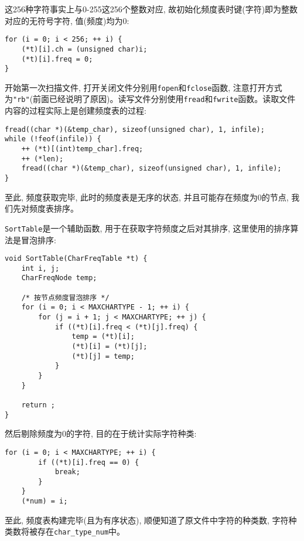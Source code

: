 \documentclass[a4paper]{ctexart}
\begin{document}
这256种字符事实上与0-255这256个整数对应, 故初始化频度表时键(字符)即为整数对应的无符号字符, 值(频度)均为0:

{\setmainfont{Courier New Bold}              
\begin{lstlisting}
for (i = 0; i < 256; ++ i) {
    (*t)[i].ch = (unsigned char)i;
    (*t)[i].freq = 0;
}
\end{lstlisting}}

开始第一次扫描文件, 打开关闭文件分别用\texttt{fopen}和\texttt{fclose}函数, 注意打开方式为\texttt{"rb"}(前面已经说明了原因)。读写文件分别使用\texttt{fread}和\texttt{fwrite}函数。读取文件内容的过程实际上是创建频度表的过程:

{\setmainfont{Courier New Bold}              
\begin{lstlisting}
fread((char *)(&temp_char), sizeof(unsigned char), 1, infile);
while (!feof(infile)) {
    ++ (*t)[(int)temp_char].freq;
    ++ (*len);
    fread((char *)(&temp_char), sizeof(unsigned char), 1, infile);
}
\end{lstlisting}}

至此, 频度获取完毕, 此时的频度表是无序的状态, 并且可能存在频度为0的节点, 我们先对频度表排序。

\texttt{SortTable}是一个辅助函数, 用于在获取字符频度之后对其排序, 这里使用的排序算法是冒泡排序:

{\setmainfont{Courier New Bold}              
\begin{lstlisting}
void SortTable(CharFreqTable *t) {
    int i, j;
    CharFreqNode temp;

    /* 按节点频度冒泡排序 */
    for (i = 0; i < MAXCHARTYPE - 1; ++ i) {
        for (j = i + 1; j < MAXCHARTYPE; ++ j) {
            if ((*t)[i].freq < (*t)[j].freq) {
                temp = (*t)[i];
                (*t)[i] = (*t)[j];
                (*t)[j] = temp;
            }
        }
    }

    return ;
}
\end{lstlisting}}

然后剔除频度为0的字符, 目的在于统计实际字符种类:

{\setmainfont{Courier New Bold}              
\begin{lstlisting}
for (i = 0; i < MAXCHARTYPE; ++ i) {
        if ((*t)[i].freq == 0) {
            break;
        }
    }
    (*num) = i;
\end{lstlisting}}

至此, 频度表构建完毕(且为有序状态), 顺便知道了原文件中字符的种类数, 字符种类数将被存在\texttt{char\_type\_num}中。
\end{document}
